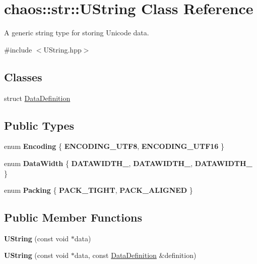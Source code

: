 \hypertarget{classchaos_1_1str_1_1_u_string}{\section{chaos\-:\-:str\-:\-:U\-String Class Reference}
\label{classchaos_1_1str_1_1_u_string}
}


A generic string type for storing Unicode data.  




{\ttfamily \#include $<$U\-String.\-hpp$>$}

\subsection*{Classes}
\begin{DoxyCompactItemize}
\item 
struct \hyperlink{structchaos_1_1str_1_1_u_string_1_1_data_definition}{Data\-Definition}
\end{DoxyCompactItemize}
\subsection*{Public Types}
\begin{DoxyCompactItemize}
\item 
enum {\bfseries Encoding} \{ {\bfseries E\-N\-C\-O\-D\-I\-N\-G\-\_\-\-U\-T\-F8}, 
{\bfseries E\-N\-C\-O\-D\-I\-N\-G\-\_\-\-U\-T\-F16}
 \}
\item 
enum {\bfseries Data\-Width} \{ {\bfseries D\-A\-T\-A\-W\-I\-D\-T\-H\-\_}, 
{\bfseries D\-A\-T\-A\-W\-I\-D\-T\-H\-\_}, 
{\bfseries D\-A\-T\-A\-W\-I\-D\-T\-H\-\_}
 \}
\item 
enum {\bfseries Packing} \{ {\bfseries P\-A\-C\-K\-\_\-\-T\-I\-G\-H\-T}, 
{\bfseries P\-A\-C\-K\-\_\-\-A\-L\-I\-G\-N\-E\-D}
 \}
\end{DoxyCompactItemize}
\subsection*{Public Member Functions}
\begin{DoxyCompactItemize}
\item 
\hypertarget{classchaos_1_1str_1_1_u_string_a1da05f1add70f58c4a8e4b5258db2e01}{{\bfseries U\-String} (const void $\ast$data)}\label{classchaos_1_1str_1_1_u_string_a1da05f1add70f58c4a8e4b5258db2e01}

\item 
\hypertarget{classchaos_1_1str_1_1_u_string_ace81f026f57f1db18fa893d1ae474b6b}{{\bfseries U\-String} (const void $\ast$data, const \hyperlink{structchaos_1_1str_1_1_u_string_1_1_data_definition}{Data\-Definition} \&definition)}\label{classchaos_1_1str_1_1_u_string_ace81f026f57f1db18fa893d1ae474b6b}

\end{DoxyCompactItemize}



